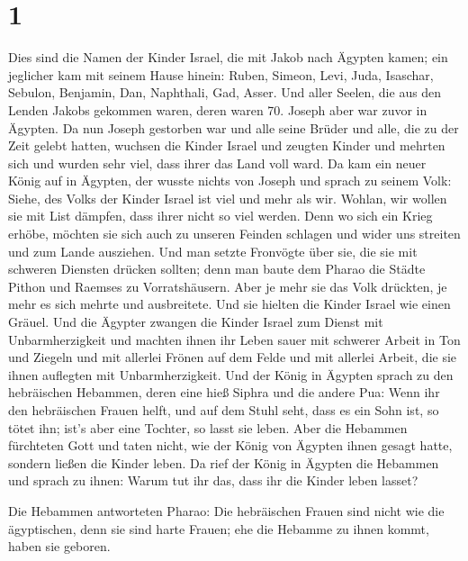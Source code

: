 \hypertarget{section}{%
\section{1}\label{section}}

 Dies sind die Namen der Kinder Israel, die mit Jakob nach
Ägypten kamen; ein jeglicher kam mit seinem Hause hinein: 
Ruben, Simeon, Levi, Juda,  Isaschar, Sebulon, Benjamin,
 Dan, Naphthali, Gad, Asser.  Und aller
Seelen, die aus den Lenden Jakobs gekommen waren, deren waren 70. Joseph
aber war zuvor in Ägypten.  Da nun Joseph gestorben war
und alle seine Brüder und alle, die zu der Zeit gelebt hatten,
 wuchsen die Kinder Israel und zeugten Kinder und mehrten
sich und wurden sehr viel, dass ihrer das Land voll ward. 
Da kam ein neuer König auf in Ägypten, der wusste nichts von Joseph
 und sprach zu seinem Volk: Siehe, des Volks der Kinder
Israel ist viel und mehr als wir.  Wohlan, wir wollen sie
mit List dämpfen, dass ihrer nicht so viel werden. Denn wo sich ein
Krieg erhöbe, möchten sie sich auch zu unseren Feinden schlagen und
wider uns streiten und zum Lande ausziehen.  Und man
setzte Fronvögte über sie, die sie mit schweren Diensten drücken
sollten; denn man baute dem Pharao die Städte Pithon und Raemses zu
Vorratshäusern.  Aber je mehr sie das Volk drückten, je
mehr es sich mehrte und ausbreitete. Und sie hielten die Kinder Israel
wie einen Gräuel.  Und die Ägypter zwangen die Kinder
Israel zum Dienst mit Unbarmherzigkeit  und machten ihnen
ihr Leben sauer mit schwerer Arbeit in Ton und Ziegeln und mit allerlei
Frönen auf dem Felde und mit allerlei Arbeit, die sie ihnen auflegten
mit Unbarmherzigkeit.  Und der König in Ägypten sprach zu
den hebräischen Hebammen, deren eine hieß Siphra und die andere Pua:
 Wenn ihr den hebräischen Frauen helft, und auf dem Stuhl
seht, dass es ein Sohn ist, so tötet ihn; ist's aber eine Tochter, so
lasst sie leben.  Aber die Hebammen fürchteten Gott und
taten nicht, wie der König von Ägypten ihnen gesagt hatte, sondern
ließen die Kinder leben.  Da rief der König in Ägypten
die Hebammen und sprach zu ihnen: Warum tut ihr das, dass ihr die Kinder
leben lasset?

 Die Hebammen antworteten Pharao: Die hebräischen Frauen
sind nicht wie die ägyptischen, denn sie sind harte Frauen; ehe die
Hebamme zu ihnen kommt, haben sie geboren.

